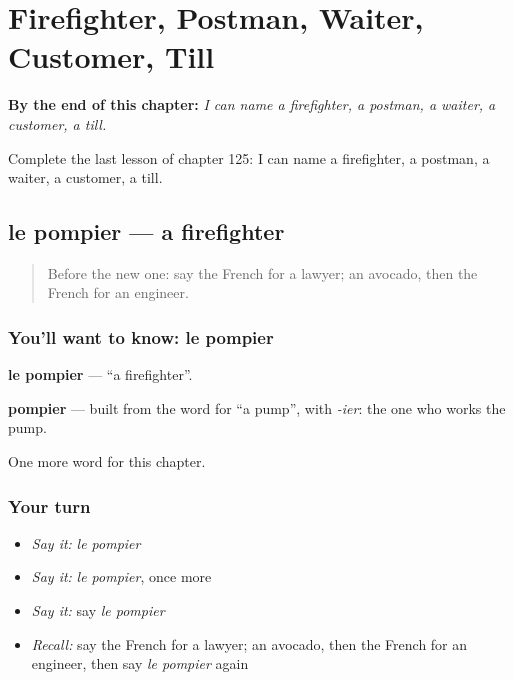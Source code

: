 
\chapter{Firefighter, Postman, Waiter, Customer, Till}
\label{ch:fr-firefighter-postman-waiter-customer-till}

\begin{chapteropening}
\textbf{By the end of this chapter:} \emph{I can name a firefighter, a postman, a waiter, a customer, a till.}

Complete the last lesson of chapter 125: I can name a firefighter, a postman, a waiter, a customer, a till.
\end{chapteropening}

\section[le pompier]{le pompier — a firefighter}

\label{lesson:FR-C125-pompier}



\begin{quote}
Before the new one: say the French for a lawyer; an avocado, then the French for an engineer.
\end{quote}

\subsection*{You'll want to know: le pompier}
\textbf{le pompier} — \textquotedblleft{}a firefighter\textquotedblright{}.

\begin{cousinweb}
\textbf{pompier} — built from the word for \textquotedblleft{}a pump\textquotedblright{}, with \emph{-ier}: the one who works the pump.
\end{cousinweb}

\begin{grammarlens}[title={What you've built}]
One more word for this chapter.
\end{grammarlens}

\subsection*{Your turn}
\begin{itemize}
\raggedright
  \item \emph{Say it:} \emph{le pompier}
  \item \emph{Say it:} \emph{le pompier}, once more
  \item \emph{Say it:} say \emph{le pompier}
  \item \emph{Recall:} say the French for a lawyer; an avocado, then the French for an engineer, then say \emph{le pompier} again
\end{itemize}

